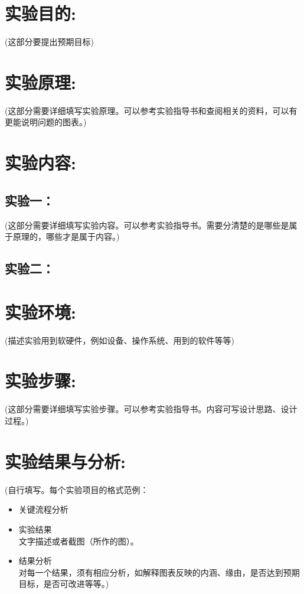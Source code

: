 \documentclass[a4paper,11pt,UTF8]{ctexart}
\begin{document}
\section{实验目的:}

(这部分要提出预期目标)

\section{实验原理:}

(这部分需要详细填写实验原理。可以参考实验指导书和查阅相关的资料，可以有更能说明问题的图表。)

\section{实验内容:}
\subsection{实验一：}
(这部分需要详细填写实验内容。可以参考实验指导书。需要分清楚的是哪些是属于原理的，哪些才是属于内容。)
\subsection{实验二：}

\section{实验环境:}

(描述实验用到软硬件，例如设备、操作系统、用到的软件等等)

\section{实验步骤:}

(这部分需要详细填写实验步骤。可以参考实验指导书。内容可写设计思路、设计过程。)

\section{实验结果与分析:}

(自行填写。每个实验项目的格式范例：
\begin{itemize}
  \item 关键流程分析
  \item 实验结果 \\ 文字描述或者截图（所作的图）。
  \item 结果分析 \\ 对每一个结果，须有相应分析，如解释图表反映的内涵、缘由，是否达到预期目标，是否可改进等等。)
\end{itemize}
\end{document}

